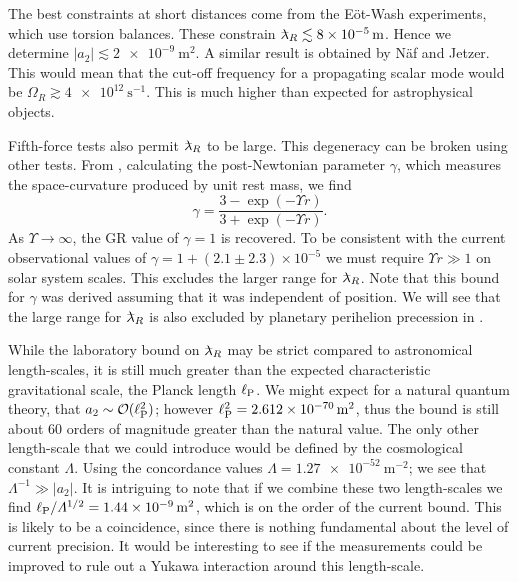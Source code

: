 The best constraints at short distances come from the E\"{o}t-Wash experiments, which use torsion balances\cite{Kapner2007a, Hoyle2004}. These constrain $\lambdabar_R \lesssim \SI{8e-5}{\metre}$. Hence we determine $|a_2| \lesssim \SI{2e-9}{\metre^2}$. A similar result is obtained by N\"{a}f and Jetzer\cite{Naf2010}. This would mean that the cut-off frequency for a propagating scalar mode would be $\Omega_R \gtrsim \SI{4e12}{\second^{-1}}$. This is much higher than expected for astrophysical objects.

Fifth-force tests also permit $\lambdabar_R$ to be large. This degeneracy can be broken using other tests. From , calculating the post-Newtonian parameter $\gamma$, which measures the space-curvature produced by unit rest mass\cite{Will2006}, we find\cite{Olmo2007c, DeFelice2010}
\begin{equation}
\gamma = \frac{3 - \exp(-\Upsilon r)}{3 + \exp(-\Upsilon r)}.
\end{equation}
As $\Upsilon \rightarrow \infty$, the GR value of $\gamma = 1$ is recovered. To be consistent with the current observational values of $\gamma = 1 + (2.1 \pm 2.3) \times 10^{-5}$\cite{Will2006, Bertotti2003} we must require $\Upsilon r \gg 1$ on solar system scales. This excludes the larger range for $\lambdabar_R$. Note that this bound for $\gamma$ was derived assuming that it was independent of position. We will see that the large range for $\lambdabar_R$ is also excluded by planetary perihelion precession in .

While the laboratory bound on $\lambdabar_R$ may be strict compared to astronomical length-scales, it is still much greater than the expected characteristic gravitational scale, the Planck length $\ell_\mathrm{P}$. We might expect for a natural quantum theory, that $a_2 \sim \mathcal{O}({\ell_\mathrm{P}^2})$; however $\ell_\mathrm{P}^2 = \SI{2.612e-70}{\metre^2}$, thus the bound is still about $60$ orders of magnitude greater than the natural value. The only other length-scale that we could introduce would be defined by the cosmological constant $\Lambda$. Using the concordance values\cite{Hinshaw2009} $\Lambda = \SI{1.27e-52}{\metre^{-2}}$; we see that $\Lambda^{-1} \gg |a_2|$. It is intriguing to note that if we combine these two length-scales we find ${\ell_\mathrm{P}}/{\Lambda^{1/2}} = \SI{1.44e-9}{\metre^2}$, which is on the order of the current bound. This is likely to be a coincidence, since there is nothing fundamental about the level of current precision. It would be interesting to see if the measurements could be improved to rule out a Yukawa interaction around this length-scale.

